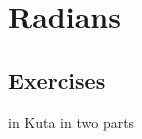 \section{Radians}
\noindent{}
\newpage

\newpage
\subsection{Exercises}
in Kuta in two parts
~\vfill


{}
